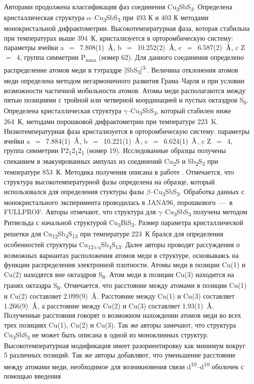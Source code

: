 Авторами \cite{Pfitzner1998a} продолжена классификация фаз соединения Cu\textsubscript{3}SbS\textsubscript{3}. Определена кристаллическая структура $\alpha$--Cu\textsubscript{3}SbS\textsubscript{3} при 493 К и 403 К методами монокристальной дифрактометрии. Высокотемпературная фаза, которая стабильна при температурах выше 394~К, кристализуется в орторомбическую систему: параметры ячейки a~$=$~7.808(1)~$\mbox{\normalfont\AA}$, b~$=$~10.252(2)~$\mbox{\normalfont\AA}$, c~$=$~6.587(2)~$\mbox{\normalfont\AA}$,  c Z~$=$~4, группа симметрии P\textsubscript{nma} (номер 62). Для данного соединения определено распределение атомов меди в тэтраэдре [SbS\textsubscript{3}]\textsuperscript{3-}. Величина отклонения атомов меди определена методом негармоничного развития Грама--Чарля и при условии возможности частичной мобильности атомов. Атомы меди располагаются между пятью позициями с тройной или четверной координацией и пустых октаэдров S\textsubscript{6}. Определена кристаллическая структура $\gamma$--Cu\textsubscript{3}SbS\textsubscript{3}, который стабилен ниже 264~К, методами порошковой дифрактометрии при температуре 223~K. Низкотемпературная фаза кристализуется в орторомбическую систему: параметры ячейки a~$=$~7.884(1)~$\mbox{\normalfont\AA}$, b~$=$~10.221(1)~$\mbox{\normalfont\AA}$, c~$=$~6.624(1)~$\mbox{\normalfont\AA}$,  c Z~$=$~4, группа симметрии P2\textsubscript{1}2\textsubscript{1}2\textsubscript{1} (номер 19). Исследованные образцы получены спеканием в эвакуированных ампулах из соединений Cu\textsubscript{2}S и Sb\textsubscript{2}S\textsubscript{3} при температуре 853~К. Методика получения описана в работе \cite{Pfitzner_1994}. Отмечается, что структура высокотемпературной фазы определена на образце,  который использовался для определения стуктуры фазы $\beta$--Cu\textsubscript{3}SbS\textsubscript{3}. Обработка данных с монокристального эксперимента проводилась в JANA96, порошкового~---~в FULLPROF. Авторы отмечают, что структура для $\gamma$--Cu\textsubscript{3}SbS\textsubscript{3} получена методом Ритвельда с начальной структурой Cu\textsubscript{3}BiS\textsubscript{3}. Размер параметра кристаллической решетки для Cu\textsubscript{12}Sb\textsubscript{4}S\textsubscript{13} при температуре 223~К брался для определения особенностей структуры Cu\textsubscript{12+x}Sb\textsubscript{4}S\textsubscript{13}. Далее авторы проводят рассуждения о возможных вариантах расположения атомов меди в структуре, основываясь на  функции распределения электронной плотности. Атомы меди в позиции Cu(1) и Cu(2) находятся вне октаэдров S\textsubscript{6}. Атом меди в позиции Cu(3) находится на гранях октаэдра  S\textsubscript{6}. Отмечается, что расстояние между атомами в позиции Cu(1) и Cu(2) составляет 2.099(9)~$\mbox{\normalfont\AA}$. Расстояние между  Cu(1) и Cu(3)  составляет 1.266(9)~$\mbox{\normalfont\AA}$, а расстояние между  Cu(2) и Cu(3)  составляет 1.93(1)~$\mbox{\normalfont\AA}$. Полученные расстояния говорят о возможном нахождении атомов меди во всех трех позициях Cu(1), Cu(2) и Cu(3). Так же авторы замечают, что структура Cu\textsubscript{3}SbS\textsubscript{3} не может быть описана в одной из моноклинных структур. Высокотемпературная модификация имеет разориентировку как минимум вокруг 5 различных позиций. Так же авторы добавляют, что уменьшение расстояние между атомами меди, необходимое для возникновения связи d\textsuperscript{10}--d\textsuperscript{10} оболочек с помощью введения 